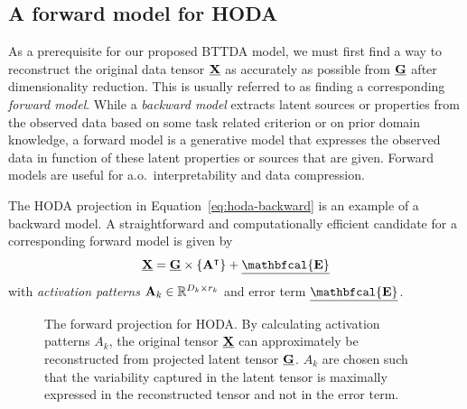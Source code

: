 \documentclass[twocolumn]{article}
\begin{document}
\subsection{A forward model for \textsc{HODA}}
As a prerequisite for our proposed \textsc{BTTDA} model, we must first find a
way to reconstruct the original data tensor $\underline{\mathbf{X}}$ as accurately as possible
from $\underline{\mathbf{G}}$ after dimensionality reduction.
This is usually referred to as finding a corresponding \emph{forward model}.
While a \emph{backward model} extracts latent sources or properties from the observed
data based on some task related criterion or on prior domain knowledge,
a forward model is a generative model that expresses the observed data in
function of these latent properties or sources that are given.
Forward models are useful for a.o.\ interpretability and data compression.

The \textsc{HODA} projection in Equation~\ref{eq:hoda-backward} is an example
of a backward model.
A straightforward and computationally efficient candidate for a corresponding
forward model is given by
\begin{equation}
	\ten{X} = \ten{G}\mmpr{\mat{A}^\intercal} + \ten{\mathbfcal{E}}
	\label{eq:HODA-forward}
\end{equation}
with \emph{activation patterns} $\mathbf{A}_k \in \mathbb{R}^{D_k\times r_k}$
and error term $\ten{\mathbfcal{E}}$.
\begin{figure}[t]
	\centering
	
	\caption{The forward projection for \textsc{HODA}. By calculating activation
		patterns $A_k$, the original tensor $\underline{\mathbf{X}}$ can approximately be
		reconstructed from projected latent tensor $\underline{\mathbf{G}}$. $A_k$ are chosen such
		that the variability captured in the latent tensor is maximally expressed in
		the reconstructed tensor and not in the error term.}
	\label{fig:HODA-forward}
\end{figure}
\end{document}
